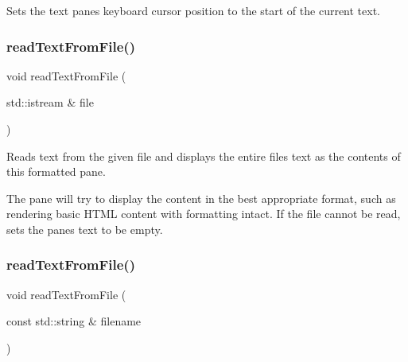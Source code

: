 Sets the text pane\textquotesingle{}s keyboard cursor position to the start of the current text. 

\mbox{\label{classGBrowserPane_a5e6d9158a9311204ca49518c32072ce0}} 
\subsubsection{\texorpdfstring{read\+Text\+From\+File()}{readTextFromFile()}\hspace{0.1cm}{\footnotesize\ttfamily [1/2]}}
{\footnotesize\ttfamily void read\+Text\+From\+File (\begin{DoxyParamCaption}\item[{std\+::istream \&}]{file }\end{DoxyParamCaption})\hspace{0.3cm}{\ttfamily [virtual]}}



Reads text from the given file and displays the entire file\textquotesingle{}s text as the contents of this formatted pane. 

The pane will try to display the content in the best appropriate format, such as rendering basic H\+T\+ML content with formatting intact. If the file cannot be read, sets the pane\textquotesingle{}s text to be empty. \mbox{\label{classGBrowserPane_a58c4154aa0c23bc980d45bf9de7cc95c}} 
\subsubsection{\texorpdfstring{read\+Text\+From\+File()}{readTextFromFile()}\hspace{0.1cm}{\footnotesize\ttfamily [2/2]}}
{\footnotesize\ttfamily void read\+Text\+From\+File (\begin{DoxyParamCaption}\item[{const std\+::string \&}]{filename }\end{DoxyParamCaption})\hspace{0.3cm}{\ttfamily [virtual]}}



